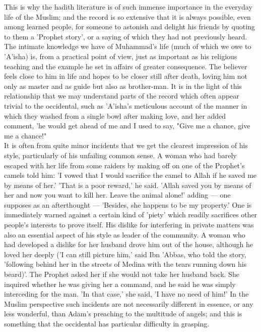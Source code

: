 \documentclass[11pt, b5paper, twoside]{book}
\begin{document}
This is why the hadith literature is of such immense importance in the everyday life of the Muslim; 
and the record is so extensive that it is always possible, even among learned people, for someone to 
astonish and delight his friends by quoting to them a 'Prophet story', or a saying of which they had 
not previously heard. The intimate knowledge we have of Muhammad's life (much of which we owe to 
'A'isha) is, from a practical point of view, just as important as his religious teaching and the 
example he set in affairs of greater consequence. The believer feels close to him in life and hopes 
to be closer still after death, loving him not only as master and as guide but also as brother-man. 
It is in the light of this relationship that we may understand parts of the record which often appear 
trivial to the occidental, such as 'A'isha's meticulous account of the manner in which they washed 
from a single bowl after making love, and her added comment, 'he would get ahead of me and I used to 
say, "Give me a chance, give me a chance!" \\

It is often from quite minor incidents that we get the clearest impression of his style, particularly 
of his unfailing common sense. A woman who had barely escaped with her life from some raiders by 
making off on one of the Prophet's camels told him: 'I vowed that I would sacrifice the camel to 
Allah if he saved me by means of her.' 'That is a poor reward,' he said. 'Allah saved you by means of 
her and now you want to kill her. Leave the animal alone!' adding --- one supposes as an afterthought --- 
'Besides, she happens to be my property.' One is immediately warned against a certain kind of 'piety' 
which readily sacrifices other people's interests to prove itself. His dislike for interfering in 
private matters was also an essential aspect of his style as leader of the community. A woman who had 
developed a dislike for her husband drove him out of the house, although he loved her deeply ('I can 
still picture him,' said Ibn 'Abbas, who told the story, 'following behind her in the streets of 
Medina with the tears running down his beard)'. The Prophet asked her if she would not take her 
husband back. She inquired whether he was giving her a command, and he said he was simply interceding 
for the man. 'In that case,' she said, 'I have no need of him!' In the Muslim perspective such 
incidents are not necessarily different in essence, or any less wonderful, than Adam's preaching to 
the multitude of angels; and this is something that the occidental has particular difficulty in 
grasping. \\
\end{document}
